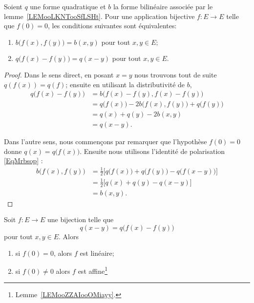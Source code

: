 \begin{lemma}   \label{LemewGJmM}
    Soient \( q\) une forme quadratique et \( b\) la forme bilinéaire associée par le lemme~\ref{LEMooLKNTooSfLSHt}.  Pour une application bijective \( f\colon E\to E\) telle que \( f(0)=0\), les conditions suivantes sont équivalentes:
    \begin{enumerate}
        \item
            \( b\big( f(x),f(y) \big)=b(x,y)\) pour tout \( x,y\in E\);
        \item
            \( q\big( f(x)-f(y) \big)=q(x-y)\) pour tout \( x,y\in E\).
    \end{enumerate}
\end{lemma}

\begin{proof}
    Dans le sens direct, en posant \( x=y\) nous trouvons tout de suite \( q(f(x))=q(f)\); ensuite en utilisant la distributivité de \( b\),
    \begin{subequations}
        \begin{align}
            q\big( f(x)-f(y) \big)&=b\big( f(x)-f(y),f(x)-f(y) \big)\\
            &=q\big( f(x) \big)-2b\big( f(x),f(y) \big)+q\big( f(y) \big)\\
            &=q(x)+q(y)-2b(x,y)\\
            &=q(x-y).
        \end{align}
    \end{subequations}

    Dans l'autre sens, nous commençons par remarquer que l'hypothèse \( f(0)=0\) donne \( q(x)=q\big( f(x) \big)\). Ensuite nous utilisons l'identité de polarisation \eqref{EqMrbsop} :
    \begin{subequations}
        \begin{align}
            b\big( f(x),f(y) \big)&=\frac{ 1 }{2}\big[ q\big( f(x) \big)+q\big( f(y) \big)-q\big( f(x-y) \big) \big]\\
            &=\frac{ 1 }{2}\big[ q(x)+q(y)-q(x-y) \big]\\
            &=b(x,y).
        \end{align}
    \end{subequations}
\end{proof}

\begin{theorem}     \label{ThoDsFErq}
    Soit \( f\colon E\to E\) une bijection telle que
    \begin{equation}
        q(x-y)=q\big( f(x)-f(y) \big)
    \end{equation}
    pour tout \( x,y\in E\). Alors
    \begin{enumerate}
        \item
            si \( f(0)=0\), alors \( f\) est linéaire;
        \item
            si \( f(0)\neq 0\) alors \( f\) est affine\footnote{Lemme~\ref{LEMooZZAIooOMiayy}.}
    \end{enumerate}
\end{theorem}

